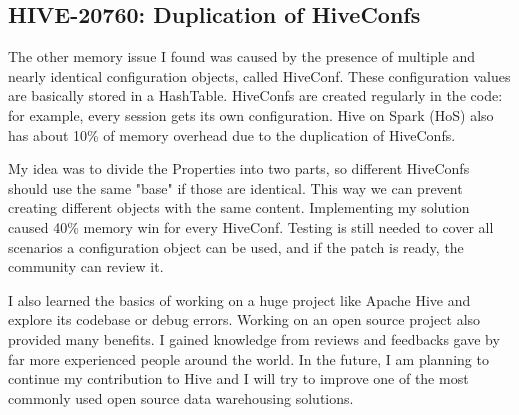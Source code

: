\subsection{HIVE-20760: Duplication of HiveConfs}
The other memory issue I found was caused by the presence of multiple and nearly identical configuration objects, called HiveConf. These configuration values are basically stored in a HashTable. HiveConfs are created regularly in the code: for example, every session gets its own configuration. Hive on Spark (HoS) also has about 10\% of memory overhead due to the duplication of HiveConfs. 

My idea was to divide the Properties into two parts, so different HiveConfs should use the same "base" if those are identical. This way we can prevent creating different objects with the same content. Implementing my solution caused 40\% memory win for every HiveConf. Testing is still needed to cover all scenarios a configuration object can be used, and if the patch is ready, the community can review it.

I also learned the basics of working on a huge project like Apache Hive and explore its codebase or debug errors. Working on an open source project also provided many benefits. I gained knowledge from reviews and feedbacks gave by far more experienced people around the world. In the future, I am planning to continue my contribution to Hive and I will try to improve one of the most commonly used open source data warehousing solutions.